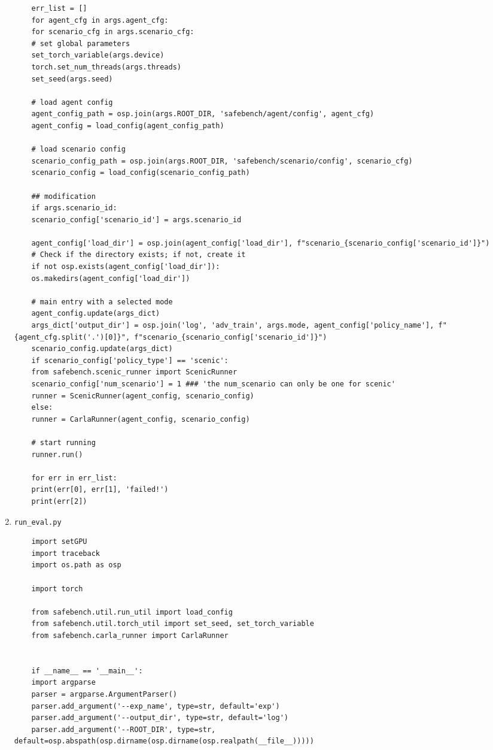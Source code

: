 \begin{enumerate}
\begin{verbatim}
	err_list = []
	for agent_cfg in args.agent_cfg:
	for scenario_cfg in args.scenario_cfg:
	# set global parameters
	set_torch_variable(args.device)
	torch.set_num_threads(args.threads)
	set_seed(args.seed)
	
	# load agent config
	agent_config_path = osp.join(args.ROOT_DIR, 'safebench/agent/config', agent_cfg)
	agent_config = load_config(agent_config_path)
	
	# load scenario config
	scenario_config_path = osp.join(args.ROOT_DIR, 'safebench/scenario/config', scenario_cfg)
	scenario_config = load_config(scenario_config_path)
	
	## modification
	if args.scenario_id:
	scenario_config['scenario_id'] = args.scenario_id
	
	agent_config['load_dir'] = osp.join(agent_config['load_dir'], f"scenario_{scenario_config['scenario_id']}")
	# Check if the directory exists; if not, create it
	if not osp.exists(agent_config['load_dir']):
	os.makedirs(agent_config['load_dir'])        
	
	# main entry with a selected mode
	agent_config.update(args_dict)
	args_dict['output_dir'] = osp.join('log', 'adv_train', args.mode, agent_config['policy_name'], f"{agent_cfg.split('.')[0]}", f"scenario_{scenario_config['scenario_id']}")
	scenario_config.update(args_dict)
	if scenario_config['policy_type'] == 'scenic':
	from safebench.scenic_runner import ScenicRunner
	scenario_config['num_scenario'] = 1 ### 'the num_scenario can only be one for scenic'
	runner = ScenicRunner(agent_config, scenario_config)
	else:
	runner = CarlaRunner(agent_config, scenario_config)
	
	# start running
	runner.run()
	
	for err in err_list:
	print(err[0], err[1], 'failed!')
	print(err[2])
	\end{verbatim}
\item \texttt{run\_eval.py}
\begin{verbatim}
	import setGPU
	import traceback
	import os.path as osp
	
	import torch 
	
	from safebench.util.run_util import load_config
	from safebench.util.torch_util import set_seed, set_torch_variable
	from safebench.carla_runner import CarlaRunner
	
	
	if __name__ == '__main__':
	import argparse
	parser = argparse.ArgumentParser()
	parser.add_argument('--exp_name', type=str, default='exp')
	parser.add_argument('--output_dir', type=str, default='log')
	parser.add_argument('--ROOT_DIR', type=str, default=osp.abspath(osp.dirname(osp.dirname(osp.realpath(__file__)))))
	

\end{verbatim}
\end{enumerate}
